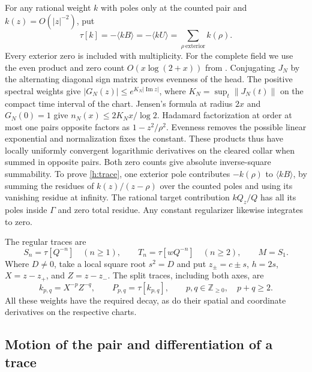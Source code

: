 For any rational weight \(k\) with poles only at the counted pair and
\(k(z)=O(|z|^{-2})\), put
\begin{equation}\label{h:trace}
 \tau[k]= -\langle kB\rangle=-\langle kU\rangle
        =\sum_{\rho\ \mathrm{exterior}} k(\rho).
\end{equation}
Every exterior zero is included with multiplicity. For the complete
field we use the even product and zero count \(O(x\log(2+x))\)
from \cite[Section~2]{agc}. Conjugating \(J_N\) by the alternating
diagonal sign matrix proves evenness of the head. The positive
spectral weights give \(|G_N(z)|\le e^{K_N|\operatorname{Im}z|}\), where
\(K_N=\sup_t\|J_N(t)\|\) on the compact time interval of the chart.
Jensen's formula at radius \(2x\) and \(G_N(0)=1\) give
\(n_N(x)\le 2K_Nx/\log 2\).
Hadamard factorization at order at most one pairs opposite factors
as \(1-z^2/\rho^2\). Evenness removes the possible linear exponential
and normalization fixes the constant. These products thus have locally
uniformly convergent logarithmic derivatives on the cleared collar
when summed in opposite pairs. Both zero counts give absolute
inverse-square summability. To prove \eqref{h:trace}, one exterior
pole contributes \(-k(\rho)\) to \(\langle kB\rangle\), by summing
the residues of \(k(z)/(z-\rho)\) over the counted poles and using
its vanishing residue at infinity. The rational target contribution
\(kQ_z/Q\) has all its poles inside \(\Gamma\) and zero total residue.
Any constant regularizer likewise integrates to zero.

The regular traces are
\begin{equation}\label{h:st}
 S_n=\tau[Q^{-n}]\quad(n\ge1),\qquad
 T_n=\tau[wQ^{-n}]\quad(n\ge2),\qquad M=S_1.
\end{equation}
Where \(D\ne0\), take a local square root \(s^2=D\) and put
\(z_\pm=c\pm s\), \(h=2s\), \(X=z-z_+\), and \(Z=z-z_-\).
The split traces, including both axes, are
\begin{equation}\label{h:split}
 k_{p,q}=X^{-p}Z^{-q},\qquad
 P_{p,q}=\tau[k_{p,q}],\qquad
 p,q\in\mathbb Z_{\ge0},\quad p+q\ge2 .
\end{equation}
All these weights have the required decay, as do their spatial and
coordinate derivatives on the respective charts.

\subsection{Motion of the pair and differentiation of a trace}

